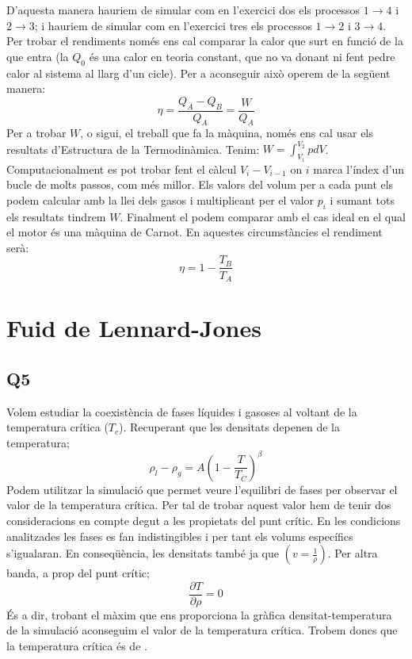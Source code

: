 \documentclass{article}
\begin{document}
	

	
	\par D'aquesta manera hauriem de simular com en l'exercici dos els processos $1\to 4$ i $2 \to 3$; i hauriem de simular com en l'exercici tres els processos $1\to2$ i $3\to4$. Per trobar el rendiments només ens cal comparar la calor que surt en funció de la que entra (la $Q_0$ és una calor en teoria constant, que no va donant ni fent pedre calor al sistema al llarg d'un cicle). Per a aconseguir això operem de la següent manera: 
	$$
	\eta =\frac{Q_A - Q_B}{Q_A}=\frac{W}{Q_A}
	$$
	Per a trobar $W$, o sigui, el treball que fa la màquina, només ens cal usar els resultats d'Estructura de la Termodinàmica.  Tenim: $W = \int_{V_1}^{V_2} pdV$. Computacionalment es pot trobar fent el càlcul $V_{i}-V_{i-1}$ on $i$ marca l'índex d'un bucle de molts passos, com més millor. Els valors del volum per a cada punt els podem calcular amb la llei dels gasos i multiplicant per el valor $p_{i}$ i sumant tots els resultats tindrem $W$. Finalment el podem comparar amb el cas ideal en el qual el motor és una màquina de Carnot. En aquestes circumstàncies el rendiment serà: 
	$$
	\eta = 1- \frac{T_B}{T_A}
	$$ 
	\section{Fuid de Lennard-Jones}
	
	\subsection*{Q5}
	
	Volem estudiar la coexistència de fases líquides i gasoses al voltant de la temperatura crítica ($T_c$). Recuperant que les densitats depenen de la temperatura;
	\begin{equation} \label{bambi}
		\rho_l-\rho_g = A\left( 1-\frac{T}{T_C}\right)^\beta
	\end{equation}
	Podem utilitzar la simulació que permet veure l'equilibri de fases per observar el valor de la temperatura crítica. 
	Per tal de trobar aquest valor hem de tenir dos consideracions en compte degut a les propietats del punt crític. En les condicions analitzades les fases es fan indistingibles i per tant els volums específics s'igualaran.
	En conseqüència, les densitats també ja que $(v=\frac{1}{\rho})$.
	Per altra banda, a prop del punt crític;
	\begin{equation}
		\frac{\partial T}{\partial \rho}=0
	\end{equation}
	És a dir, trobant el màxim que ens proporciona la gràfica densitat-temperatura de la simulació aconseguim el valor de la temperatura crítica.
	Trobem doncs que la temperatura crítica és de
	.
	\\
	\\
	
\end{document}
